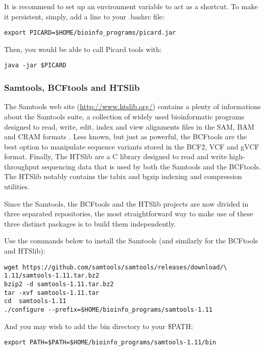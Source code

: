 It is recommend to set up an environment variable to act as a shortcut. To make it persistent, simply, add a line to your .bashrc file:

\begin{verbatim}
export PICARD=$HOME/bioinfo_programs/picard.jar
\end{verbatim}

Then, you would be able to call Picard tools with:

\begin{verbatim}
java -jar $PICARD
\end{verbatim}


\subsubsection{Samtools, BCFtools and HTSlib}


The Samtools web site (\href{http://www.htslib.org/}{http://www.htslib.org/}) contains a plenty of informations about the Samtools suite, a collection of widely used bioinformatic programs designed to read, write, edit, index and view alignments files in the SAM, BAM and CRAM formats \cite{Danecek2021}. Less known, but just as powerful, the BCFtools are the best option to manipulate sequence variants stored in the BCF2, VCF and gVCF format. Finally, The HTSlib are a C library designed to read and write high-throughput sequencing data that is used by both the Samtools and the BCFtools. The HTSlib  notably contains the tabix and bgzip indexing and compression utilities.

Since the Samtools, the BCFtools and the HTSlib projects are now divided in three separated repositories, the most straightforward way to make use of these three distinct packages is to build them independently. 

Use the commands below to install the Samtools (and similarly for the BCFtools and HTSlib):

\begin{verbatim}
wget https://github.com/samtools/samtools/releases/download/\
1.11/samtools-1.11.tar.bz2
bzip2 -d samtools-1.11.tar.bz2	
tar -xvf samtools-1.11.tar
cd  samtools-1.11
./configure --prefix=$HOME/bioinfo_programs/samtools-1.11
\end{verbatim}

And you may wish to add the bin directory to your \$PATH:

\begin{verbatim}
export PATH=$PATH=$HOME/bioinfo_programs/samtools-1.11/bin
\end{verbatim}

